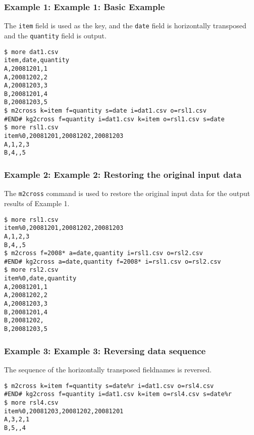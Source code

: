 \subsubsection*{Example 1: Example 1: Basic Example}

The \verb|item| field is used as the key, and the \verb|date| field is horizontally transposed and the \verb|quantity| field is output.


\begin{Verbatim}[baselinestretch=0.7,frame=single]
$ more dat1.csv
item,date,quantity
A,20081201,1
A,20081202,2
A,20081203,3
B,20081201,4
B,20081203,5
$ m2cross k=item f=quantity s=date i=dat1.csv o=rsl1.csv
#END# kg2cross f=quantity i=dat1.csv k=item o=rsl1.csv s=date
$ more rsl1.csv
item%0,20081201,20081202,20081203
A,1,2,3
B,4,,5
\end{Verbatim}
\subsubsection*{Example 2: Example 2: Restoring the original input data}

The \verb|m2cross| command is used to restore the original input data for the output results of Example 1.


\begin{Verbatim}[baselinestretch=0.7,frame=single]
$ more rsl1.csv
item%0,20081201,20081202,20081203
A,1,2,3
B,4,,5
$ m2cross f=2008* a=date,quantity i=rsl1.csv o=rsl2.csv
#END# kg2cross a=date,quantity f=2008* i=rsl1.csv o=rsl2.csv
$ more rsl2.csv
item%0,date,quantity
A,20081201,1
A,20081202,2
A,20081203,3
B,20081201,4
B,20081202,
B,20081203,5
\end{Verbatim}
\subsubsection*{Example 3: Example 3: Reversing data sequence}

The sequence of the horizontally transposed fieldnames is reversed.


\begin{Verbatim}[baselinestretch=0.7,frame=single]
$ m2cross k=item f=quantity s=date%r i=dat1.csv o=rsl4.csv
#END# kg2cross f=quantity i=dat1.csv k=item o=rsl4.csv s=date%r
$ more rsl4.csv
item%0,20081203,20081202,20081201
A,3,2,1
B,5,,4
\end{Verbatim}
